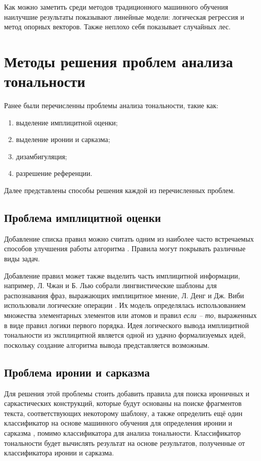 \documentclass[a4paper,14pt, unknownkeysallowed]{extreport}
\begin{document}
	Как можно заметить среди методов традиционного машинного обучения наилучшие результаты показывают линейные модели: логическая регрессия и метод опорных векторов. Также неплохо себя показывает случайных лес. 

\section{Методы решения проблем анализа тональности}

Ранее были перечисленны проблемы анализа тональности, такие как:

\begin{enumerate}
	\item выделение имплицитной оценки;
	\item выделение иронии и сарказма;
	\item дизамбигуляция;
	\item разрешение референции.
\end{enumerate}

Далее представлены способы решения каждой из перечисленных проблем.

\subsection{Проблема имплицитной оценки}

Добавление списка правил можно считать одним из наиболее часто встречаемых способов улучшения работы алгоритма \cite{Semina2}. Правила могут покрывать различные виды задач.

Добавление правил может также выделить часть имплицитной информации, например, Л. Чжан и Б. Лью собрали лингвистические шаблоны для распознавания фраз, выражающих имплицитное мнение, Л. Денг и Дж. Виби использовали логические операции \cite{Semina2}. Их модель определялась использованием множества элементарных элементов или атомов и правил \textit{если -- то}, выраженных в виде правил логики первого порядка. Идея логического вывода имплицитной тональности из эксплицитной является одной из удачно формализуемых идей, поскольку создание алгоритма вывода представляется возможным.

\subsection{Проблема иронии и сарказма}

Для решения этой проблемы стоить добавить правила для поиска ироничных и саркастических конструкций, которые будут основаны на поиске фрагментов текста, соответствующих некоторому шаблону, а также определить ещё один классификатор на основе машинного обучения для определения иронии и сарказма \cite{Semina2, Volkova}, помимо классификатора для анализа тональности. Классификатор тональности будет вычислять результат на основе результатов, полученные от классификатора иронии и сарказма.
\end{document}
